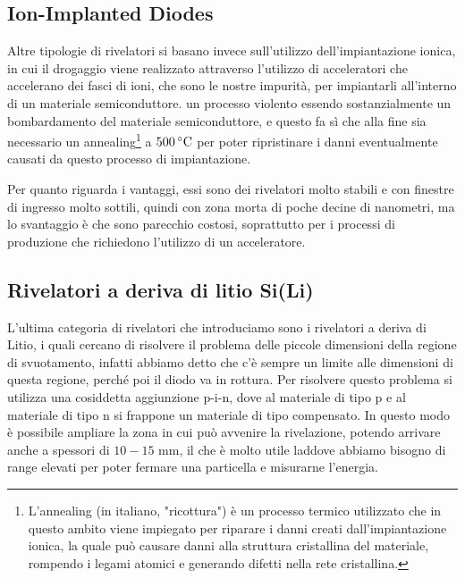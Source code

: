 \subsection{Ion-Implanted Diodes}
Altre tipologie di rivelatori si basano invece sull'utilizzo dell'impiantazione ionica, in cui il drogaggio viene realizzato attraverso l'utilizzo di acceleratori che accelerano dei fasci di ioni, che sono le nostre impurità, per impiantarli all'interno di un materiale semiconduttore. \E un processo violento essendo sostanzialmente un bombardamento del materiale semiconduttore, e questo fa sì che alla fine sia necessario un annealing\footnote{L'annealing (in italiano, "ricottura") è un processo termico utilizzato che in questo ambito viene impiegato per riparare i danni creati dall'impiantazione ionica, la quale può causare danni alla struttura cristallina del materiale, rompendo i legami atomici e generando difetti nella rete cristallina.} a $500 \, \rm ^{\circ}C$ per poter ripristinare i danni eventualmente causati da questo processo di impiantazione.

Per quanto riguarda i vantaggi, essi sono dei rivelatori molto stabili e con finestre di ingresso molto sottili, quindi con zona morta di poche decine di nanometri, ma lo svantaggio è che sono parecchio costosi, soprattutto per i processi di produzione che richiedono l'utilizzo di un acceleratore. 

\subsection{Rivelatori a deriva di litio Si(Li)}
L'ultima categoria di rivelatori che introduciamo sono i rivelatori a deriva di Litio, i quali cercano di risolvere il problema delle piccole dimensioni della regione di svuotamento, infatti abbiamo detto che c'è sempre un limite alle dimensioni di questa regione, perché poi il diodo va in rottura. Per risolvere questo problema si utilizza una cosiddetta aggiunzione p-i-n, dove al materiale di tipo p e al materiale di tipo n si frappone un materiale di tipo compensato. In questo modo è possibile ampliare la zona in cui può avvenire la rivelazione, potendo arrivare anche a spessori di $10-15$ mm, il che è molto utile laddove abbiamo bisogno di range elevati per poter fermare una particella e misurarne l'energia.

